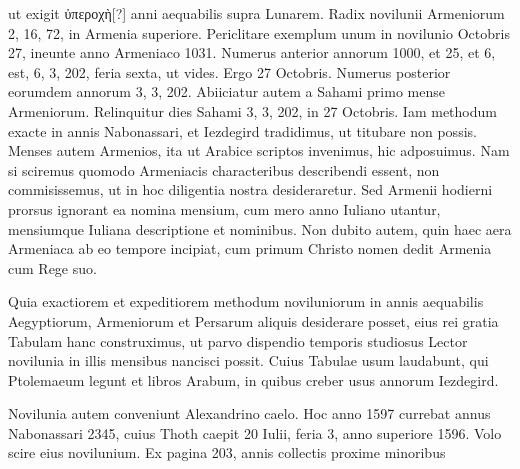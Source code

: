 ut exigit \textgreek{ὐπεροχὴ}[?] anni aequabilis supra Lunarem.
Radix novilunii Armeniorum
2, 16, 72, in Armenia superiore.
Periclitare exemplum %
 unum
in novilunio Octobris 27, ineunte anno Armeniaco 1031.
Numerus
anterior annorum 1000, et 25, et 6, est, 6, 3, 202, feria sexta, ut vides.
Ergo 27 Octobris.
Numerus posterior eorumdem annorum 3, 3, 202.
Abiiciatur autem a Sahami primo mense Armeniorum.
Relinquitur
dies Sahami 3, 3, 202, in 27 Octobris.
Iam methodum exacte
in annis Nabonassari, et
Iezdegird tradidimus, ut
titubare non possis.
Menses
autem Armenios, ita
ut Arabice scriptos invenimus, hic adposuimus.
Nam si sciremus
quomodo Armeniacis
characteribus describendi
essent, non commisissemus,
ut in hoc diligentia
nostra desideraretur.
Sed Armenii hodierni
prorsus ignorant ea nomina
mensium, cum mero %
anno Iuliano utantur,
mensiumque Iuliana descriptione
et nominibus.
Non dubito autem, quin
haec aera Armeniaca ab
eo tempore incipiat, cum
primum Christo nomen
dedit Armenia cum Rege suo.
%
%
\begin{table}[tbp]
  
\end{table}
\begin{table}[tbp]
  
\end{table}
%
Quia exactiorem et expeditiorem methodum noviluniorum in
annis aequabilis Aegyptiorum, Armeniorum et Persarum aliquis
desiderare posset, eius rei gratia Tabulam
hanc construximus, ut parvo
dispendio temporis studiosus Lector
novilunia in illis mensibus nancisci
possit.
%
Cuius Tabulae usum laudabunt,
qui Ptolemaeum legunt et libros
Arabum, in quibus creber usus
annorum Iezdegird.
%
\begin{table}[tb]
  
\end{table}
%
Novilunia autem
conveniunt Alexandrino caelo.
Hoc anno 1597 currebat annus Nabonassari
2345, cuius Thoth caepit
20 Iulii, feria 3, anno superiore 1596.
Volo scire eius novilunium.
Ex pagina
203, annis collectis proxime minoribus
